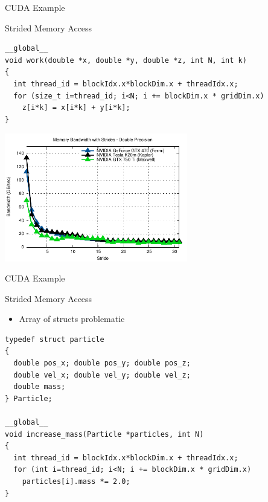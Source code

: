 \begin{frame}[fragile]{CUDA Example}

\begin{block}{Strided Memory Access}
  \begin{lstlisting}
__global__ 
void work(double *x, double *y, double *z, int N, int k)
{
  int thread_id = blockIdx.x*blockDim.x + threadIdx.x;
  for (size_t i=thread_id; i<N; i += blockDim.x * gridDim.x)
    z[i*k] = x[i*k] + y[i*k];
}  
  \end{lstlisting}
\end{block}

\vspace*{-0.5cm}
\begin{center}
 \includegraphics[width=0.6\textwidth]{figures/stride}
\end{center}

\end{frame}



\begin{frame}[fragile]{CUDA Example}

\begin{block}{Strided Memory Access}
  \begin{itemize}
   \item Array of structs problematic
  \end{itemize}
  \begin{lstlisting}  
typedef struct particle
{
  double pos_x; double pos_y; double pos_z;
  double vel_x; double vel_y; double vel_z;
  double mass;
} Particle;
  
__global__ 
void increase_mass(Particle *particles, int N)
{
  int thread_id = blockIdx.x*blockDim.x + threadIdx.x;
  for (int i=thread_id; i<N; i += blockDim.x * gridDim.x)
    particles[i].mass *= 2.0;
}  
  \end{lstlisting}
\end{block}

\end{frame}

